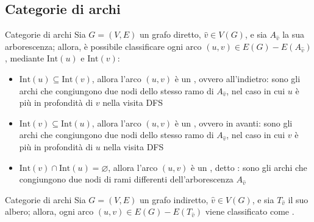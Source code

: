 \documentclass[a4paper, 12pt]{report}
\begin{document}
    \subsection{Categorie di archi}

    \begin{frameddefn}{Categorie di archi}
        Sia $G= (V, E)$ un grafo diretto, $\hat v \in V(G)$, e sia $A_{\hat v}$ la sua arborescenza; allora, è possibile classificare ogni arco $(u, v) \in E(G) - E(A_{\hat v})$, mediante $\mathrm{Int}(u)$ e $\mathrm{Int}(v)$:
        \begin{itemize}
            \item $\mathrm{Int}(u) \subseteq \mathrm{Int}(v)$, allora l'arco $(u, v)$ è un , ovvero all'indietro: sono gli archi che congiungono due nodi dello stesso ramo di $A_{\hat v}$, nel caso in cui $u$ è più in profondità di $v$ nella visita DFS 
            \item $\mathrm{Int}(v) \subseteq \mathrm{Int}(u)$, allora l'arco $(u, v)$ è un , ovvero in avanti: sono gli archi che congiungono due nodi dello stesso ramo di $A_{\hat v}$, nel caso in cui $v$ è più in profondità di $u$ nella visita DFS
            \item $\mathrm{Int}(v) \cap \mathrm{Int}(u) = \varnothing$, allora l'arco $(u, v)$ è un , detto : sono gli archi che congiungono due nodi di rami differenti dell'arborescenza $A_{\hat v}$
        \end{itemize}
    \end{frameddefn}

    \begin{frameddefn}{Categorie di archi}
        Sia $G=(V, E)$ un grafo indiretto, $\hat v \in V(G)$, e sia $T_{\hat v}$ il suo albero; allora, ogni arco $(u, v) \in E(G) - E(T_{\hat v})$ viene classificato come .
    \end{frameddefn}
\end{document}
